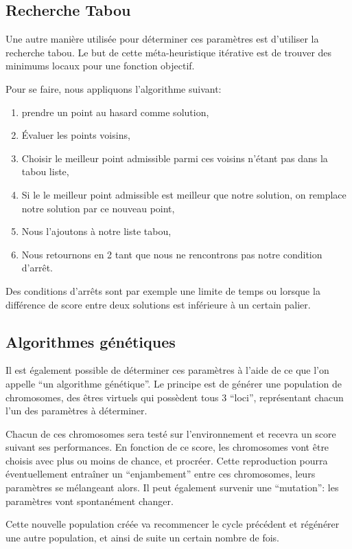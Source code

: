 \documentclass[a4paper,10pt]{report}
\begin{document}
\subsection{Recherche Tabou}

Une autre manière utilisée pour déterminer ces paramètres est d'utiliser la recherche tabou. Le but de cette méta-heuristique itérative est de trouver des minimums locaux pour une fonction objectif.

Pour se faire, nous appliquons l'algorithme suivant:
\begin{enumerate}
    \item prendre un point au hasard comme solution,
    \item Évaluer les points voisins,
    \item Choisir le meilleur point admissible parmi ces voisins n'étant pas dans la tabou liste,
    \item Si le le meilleur point admissible est meilleur que notre solution, on remplace notre solution par ce nouveau point,
    \item Nous l'ajoutons à notre liste tabou,
    \item Nous retournons en 2 tant que nous ne rencontrons pas notre condition d'arrêt.
\end{enumerate}

Des conditions d'arrêts sont par exemple une limite de temps ou lorsque la différence de score entre deux solutions est inférieure à un certain palier. \cite{glover2007principles}
\cite{bagis2011tabu}


\subsection{Algorithmes génétiques}
Il est également possible de déterminer ces paramètres à l'aide de ce que l'on appelle ``un algorithme génétique''.
Le principe est de générer une population de chromosomes, des êtres virtuels qui possèdent tous 3 ``loci'', représentant chacun l'un des paramètres à déterminer.

Chacun de ces chromosomes sera testé sur l'environnement et recevra un score suivant ses performances.
En fonction de ce score, les chromosomes vont être choisis avec plus ou moins de chance, et procréer.
Cette reproduction pourra éventuellement entraîner un ``enjambement'' entre ces chromosomes, leurs paramètres se mélangeant alors.
Il peut également survenir une ``mutation'': les paramètres vont spontanément changer.

Cette nouvelle population créée va recommencer le cycle précédent et régénérer une autre population, et ainsi de suite un certain nombre de fois.
\end{document}
